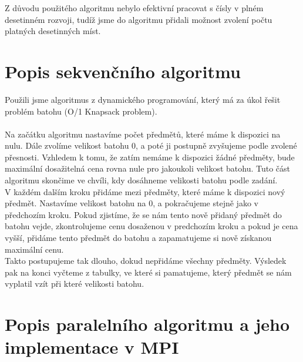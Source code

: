 \documentclass[12pt]{article}
\begin{document}
Z důvodu použitého algoritmu nebylo efektivní pracovat s čísly v plném desetinném rozvoji, tudíž jsme do algoritmu přidali možnost zvolení počtu platných desetinných míst.

\section{Popis sekvenčního algoritmu}

Použili jsme algoritmus z dynamického programování, který má za úkol řešit problém batohu (O/1 Knapsack problem).\\
\\
Na začátku algoritmu nastavíme počet předmětů, které máme k dispozici na nulu. Dále zvolíme velikost batohu 0, a poté ji postupně zvyšujeme podle zvolené přesnosti. Vzhledem k tomu, že zatím nemáme k dispozici žádné předměty, bude maximální dosažitelná cena rovna nule pro jakoukoli velikost batohu. Tuto část algoritmu skončime ve chvíli, kdy dosáhneme velikosti batohu podle zadání.\\

V každém dalším kroku přidáme mezi předměty, které máme k dispozici nový předmět. Nastavíme velikost batohu na 0, a pokračujeme stejně jako v předchozím kroku. Pokud zjistíme, že se nám tento nově přidaný předmět do batohu vejde, zkontrolujeme cenu dosaženou v predchozím kroku a pokud je cena vyšší, přidáme tento předmět do batohu a zapamatujeme si nově získanou maximální cenu.\\

Takto postupujeme tak dlouho, dokud nepřidáme všechny předměty. Výsledek pak na konci vyčteme z tabulky, ve které si pamatujeme, který předmět se nám vyplatil vzít při které velikosti batohu.

\section{Popis paralelního algoritmu a jeho implementace v MPI}
\end{document}
